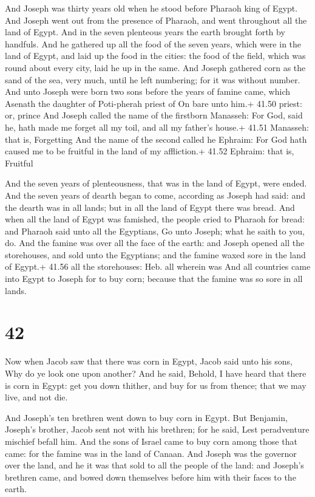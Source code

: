  And Joseph was thirty years old when he stood before
Pharaoh king of Egypt. And Joseph went out from the presence of Pharaoh,
and went throughout all the land of Egypt.  And in the
seven plenteous years the earth brought forth by handfuls. 
And he gathered up all the food of the seven years, which were in the
land of Egypt, and laid up the food in the cities: the food of the
field, which was round about every city, laid he up in the same.
 And Joseph gathered corn as the sand of the sea, very
much, until he left numbering; for it was without number. 
And unto Joseph were born two sons before the years of famine came,
which Asenath the daughter of Poti-pherah priest of On bare unto him.+
41.50 priest: or, prince  And Joseph called the name of the
firstborn Manasseh: For God, said he, hath made me forget all my toil,
and all my father's house.+ 41.51 Manasseh: that is, Forgetting
 And the name of the second called he Ephraim: For God hath
caused me to be fruitful in the land of my affliction.+ 41.52 Ephraim:
that is, Fruitful

 And the seven years of plenteousness, that was in the
land of Egypt, were ended.  And the seven years of dearth
began to come, according as Joseph had said: and the dearth was in all
lands; but in all the land of Egypt there was bread.  And
when all the land of Egypt was famished, the people cried to Pharaoh for
bread: and Pharaoh said unto all the Egyptians, Go unto Joseph; what he
saith to you, do.  And the famine was over all the face of
the earth: and Joseph opened all the storehouses, and sold unto the
Egyptians; and the famine waxed sore in the land of Egypt.+ 41.56 all
the storehouses: Heb. all wherein was  And all countries
came into Egypt to Joseph for to buy corn; because that the famine was
so sore in all lands.

\hypertarget{section-41}{%
\section{42}\label{section-41}}

 Now when Jacob saw that there was corn in Egypt, Jacob said
unto his sons, Why do ye look one upon another?  And he
said, Behold, I have heard that there is corn in Egypt: get you down
thither, and buy for us from thence; that we may live, and not die.

 And Joseph's ten brethren went down to buy corn in Egypt.
 But Benjamin, Joseph's brother, Jacob sent not with his
brethren; for he said, Lest peradventure mischief befall him.
 And the sons of Israel came to buy corn among those that
came: for the famine was in the land of Canaan.  And Joseph
was the governor over the land, and he it was that sold to all the
people of the land: and Joseph's brethren came, and bowed down
themselves before him with their faces to the earth.

